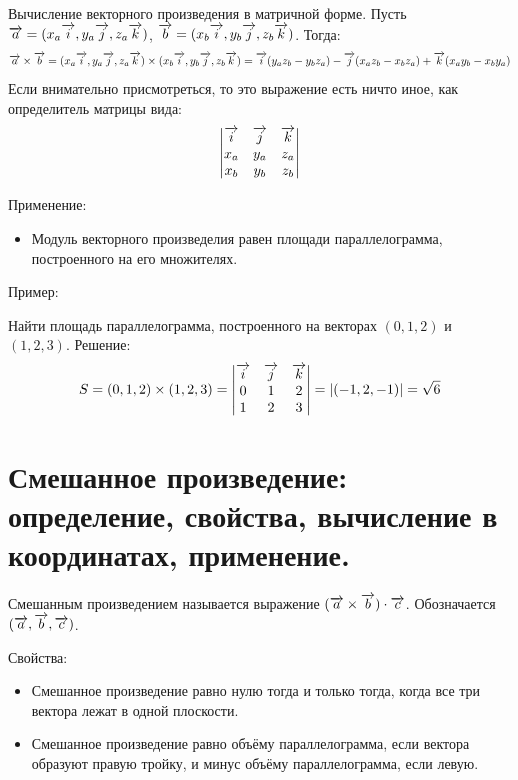 \documentclass[12pt]{article}
\begin{document}
\begin{sloppypar}
    Вычисление векторного произведения в матричной форме. Пусть $\overrightarrow{a} =  (x_a \overrightarrow{i}, y_a \overrightarrow{j}, z_a \overrightarrow{k})$, $\overrightarrow{b} =  (x_b \overrightarrow{i}, y_b \overrightarrow{j}, z_b \overrightarrow{k})$. Тогда:
    \[
        \overrightarrow{a} \times \overrightarrow{b} = (x_a \overrightarrow{i}, y_a \overrightarrow{j}, z_a \overrightarrow{k}) \times (x_b \overrightarrow{i}, y_b \overrightarrow{j}, z_b \overrightarrow{k}) = \overrightarrow{i} (y_a z_b - y_b z_a) - \overrightarrow{j} (x_a z_b - x_b z_a) + \overrightarrow{k} (x_a y_b - x_b y_a)
    \]
    Если внимательно присмотреться, то это выражение есть ничто иное, как определитель матрицы вида:
    \[
        \begin{vmatrix}
            \overrightarrow{i} & \overrightarrow{j} & \overrightarrow{k} \\
            x_a   & y_a   & z_a   \\
            x_b   & y_b   & z_b   \\
        \end{vmatrix}
    \]

    Применение:
    \begin{itemize}
        \item Модуль векторного произведелия равен площади параллелограмма, построенного на его множителях.
    \end{itemize}

    Пример:

    Найти площадь параллелограмма, построенного на векторах $(0, 1, 2)$ и $(1, 2, 3)$. Решение:
    \[
        S = (0, 1, 2) \times (1, 2, 3) = \begin{vmatrix}
            \overrightarrow{i} & \overrightarrow{j} & \overrightarrow{k} \\
            0     & 1     & 2     \\
            1     & 2     & 3     \\
        \end{vmatrix}
        = |(-1, 2, -1)| = \sqrt{6}
    \]

    \section{Смешанное произведение: определение, свойства, вычисление в координатах, применение.}
    Смешанным произведением называется выражение $(\overrightarrow{a} \times \overrightarrow{b}) \cdot \overrightarrow{c}$. Обозначается $(\overrightarrow{a}, \overrightarrow{b}, \overrightarrow{c})$.

    Свойства:
    \begin{itemize}
        \item Смешанное произведение равно нулю тогда и только тогда, когда все три вектора лежат в одной плоскости.
        \item Смешанное произведение равно объёму параллелограмма, если вектора образуют правую тройку, и минус объёму параллелограмма, если левую.
    \end{itemize}


\end{sloppypar}
\end{document}
